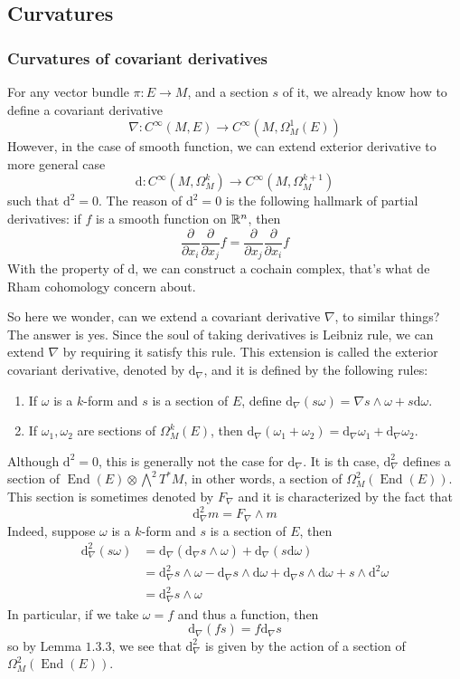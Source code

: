 \documentclass[11pt]{amsart}
\numberwithin{equation}{section}
\theoremstyle{plain}
\theoremstyle{plain}
\numberwithin{equation}{section}
\begin{document}
\subsection{Curvatures}
\subsubsection{Curvatures of covariant derivatives}
For any vector bundle $\pi:E\to M$, and a section $s$ of it, we already know how to define a covariant derivative
$$
\nabla:C^{\infty}(M,E)\to C^{\infty}(M,\Omega_M^1(E))
$$
However, in the case of smooth function, we can extend exterior derivative to more general case
$$
\mathrm{d}:C^{\infty}(M,\Omega_M^k)\to C^{\infty}(M,\Omega_M^{k+1})
$$
such that $\mathrm{d}^2=0$. The reason of $\mathrm{d}^2=0$ is the following hallmark of partial derivatives: if $f$ is a smooth function on $\Bbb{R}^n$, then
$$
\frac{\partial }{\partial x_i}\frac{\partial}{\partial x_j}f=\frac{\partial }{\partial x_j}\frac{\partial}{\partial x_i}f
$$
With the property of $\mathrm{d}$, we can construct a cochain complex, that's what de Rham cohomology concern about.

So here we wonder, can we extend a covariant derivative $\nabla$, to similar things? The answer is yes. Since the soul of taking derivatives is Leibniz rule, we can extend $\nabla$ by requiring it satisfy this rule. This extension is called the exterior covariant derivative, denoted by $\mathrm{d}_{\nabla}$, and it is defined by the following rules:
\begin{enumerate}[$1.$]
\item If $\omega$ is a $k$-form and $s$ is a section of $E$, define $\mathrm{d}_{\nabla}(s\omega)=\nabla s\wedge\omega+s\mathrm{d}\omega$.
\item If $\omega_1,\omega_2$ are sections of $\Omega_M^k(E)$, then $\mathrm{d}_{\nabla}(\omega_1+\omega_2)=\mathrm{d}_{\nabla}\omega_1+\mathrm{d}_{\nabla}\omega_2$.
\end{enumerate}

Although $\mathrm{d}^2=0$, this is generally not the case for $\mathrm{d}_{\nabla}$. It is th case, $\mathrm{d}_{\nabla}^2$ defines a section of $\operatorname{End}(E)\otimes\bigwedge^2T^*M$, in other words, a section of $\Omega_M^2(\operatorname{End}(E))$. This section is sometimes denoted by $F_{\nabla}$ and it is characterized by the fact that 
$$
\mathrm{d}_{\nabla}^2m=F_{\nabla}\wedge m
$$
Indeed, suppose $\omega$ is a $k$-form and $s$ is a section of $E$, then
$$
\begin{aligned}
\mathrm{d}_{\nabla}^2(s\omega)&=\mathrm{d}_{\nabla}(\mathrm{d}_{\nabla}s\wedge\omega)+\mathrm{d}_{\nabla}(s\mathrm{d}\omega)\\
&=\mathrm{d}_{\nabla}^2s\wedge\omega-\mathrm{d}_{\nabla}s\wedge\mathrm{d}\omega+\mathrm{d}_{\nabla}s\wedge\mathrm{d}\omega+s\wedge\mathrm{d}^2\omega\\
&=\mathrm{d}_{\nabla}^2s\wedge\omega
\end{aligned}
$$
In particular, if we take $\omega=f$ and thus a function, then
$$
\mathrm{d}_{\nabla}(fs)=f\mathrm{d}_{\nabla}s
$$ 
so by Lemma $1.3.3$, we see that $\mathrm{d}_{\nabla}^2$ is given by the action of a section of $\Omega_M^2(\operatorname{End}(E))$.
\end{document}
